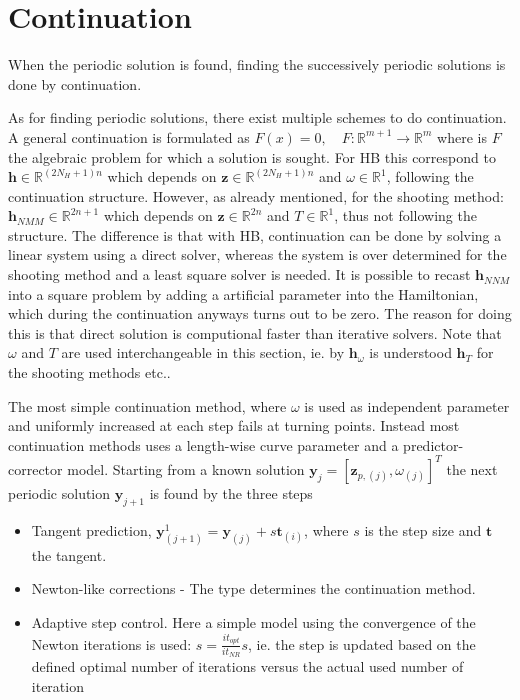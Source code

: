 

\section{Continuation}
\label{sec:continuation}

When the periodic solution is found, finding the successively periodic solutions
is done by continuation.

As for finding periodic solutions, there exist multiple schemes to do
continuation. A general continuation is formulated as $F(x)=0, \quad
F:\mathbb{R}^{m+1} \to \mathbb{R}^{m} $ where is $F$ the algebraic problem for
which a solution is sought.
For HB this correspond to $\bm h \in \mathbb{R}^{(2N_H+1)n}$ which depends on
$\bm z \in \mathbb{R}^{(2N_H+1)n}$ and $\omega \in \mathbb{R}^1$, following the
continuation structure. However, as already mentioned, for the shooting method:
$\bm h_{NMM} \in \mathbb{R}^{2n+1}$ which depends on $\bm z \in \mathbb{R}^{2n}$
and $T \in \mathbb{R}^1$, thus not following the structure.
The difference is that with HB, continuation can be done by solving a linear
system using a direct solver, whereas the system is over determined for the
shooting method and a least square solver is needed. It is possible to recast
$\bm h_{NNM}$ into a square problem by adding a artificial parameter
into the Hamiltonian, which during the continuation anyways turns out to be
zero\autocite{detroux2016_phd}. The reason for doing this is that direct
solution is computional faster than iterative solvers.
Note that $\omega$ and $T$ are used interchangeable in this section, ie. by $\bm
h_\omega$ is understood $\bm h_T$ for the shooting methods etc..


The most simple continuation method, where $\omega$ is used as independent
parameter and uniformly increased at each step fails at turning points. Instead
most continuation methods uses a length-wise curve parameter and a
predictor-corrector model. Starting from a known solution $\bm y_j = [\bm
z_{p,(j)},\omega_{(j)}]^T$ the next periodic solution $\bm y_{j+1}$ is found by
the three steps

\begin{itemize}
\item Tangent prediction, $\bm y_{(j+1)}^{1} = \bm y_{(j)}+s\bm t_{(i)}$, where
  $s$ is the step size and $\bm t$ the tangent.
\item Newton-like corrections - The type determines the continuation method.
\item Adaptive step control. Here a simple model using the convergence of the
  Newton iterations is used: $s = \frac{it_{opt}}{it_{NR}} s$, ie. the step is
  updated based on the defined optimal number of iterations versus the actual
  used number of iteration
\end{itemize}

